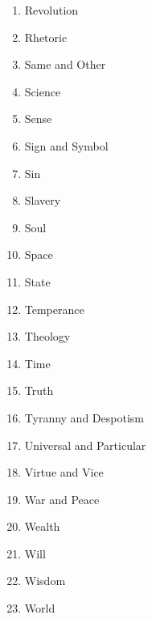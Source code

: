 \begin{multicols}{4}
\begin{enumerate}[label=\arabic*.]
    \item Revolution
    \item Rhetoric
    \item Same and Other
    \item Science
    \item Sense
    \item Sign and Symbol
    \item Sin
    \item Slavery
    \item Soul
    \item Space
    \item State
    \item Temperance
    \item Theology
    \item Time
    \item Truth
    \item Tyranny and Despotism
    \item Universal and Particular
    \item Virtue and Vice
    \item War and Peace
    \item Wealth
    \item Will
    \item Wisdom
    \item World
\end{enumerate}
\end{multicols} %
\clearpage


